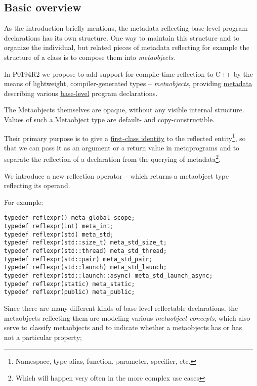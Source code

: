 \subsection{Basic overview}

As the introduction briefly mentions, the metadata reflecting base-level
program declarations has its own structure. One way to maintain this structure
and to organize the individual, but related pieces of metadata reflecting
for example the structure of a class is to compose them into {\em metaobjects}.

In P0194R2 we propose to add support for
compile-time reflection to C++ by the means of lightweight, compiler-generated
types -- {\em metaobjects}, providing \hyperref[term-metadata]{metadata}
describing various \hyperref[term-base-meta-level]{base-level} program declarations.

The Metaobjects themselves are opaque, without any visible internal structure.
Values of such a Metaobject type are default- and copy-constructible.

Their primary purpose is to give a \hyperref[term-first-class]{first-class identity}
to the reflected entity\footnote{Namespace, type alias, function, parameter,
specifier, etc.}, so that we can pass it as an argument or a return value
in metaprograms and to separate the reflection of a declaration from the querying
of metadata\footnote {Which will happen very often in the more complex use cases}.

We introduce a new reflection operator -- \verb@reflexpr@ which returns a
metaobject type reflecting its operand.

For example:

\begin{verbatim}
typedef reflexpr() meta_global_scope;
typedef reflexpr(int) meta_int;
typedef reflexpr(std) meta_std;
typedef reflexpr(std::size_t) meta_std_size_t;
typedef reflexpr(std::thread) meta_std_thread;
typedef reflexpr(std::pair) meta_std_pair;
typedef reflexpr(std::launch) meta_std_launch;
typedef reflexpr(std::launch::async) meta_std_launch_async;
typedef reflexpr(static) meta_static;
typedef reflexpr(public) meta_public;
\end{verbatim}

Since there are many different kinds of
base-level reflectable declarations, the metaobjects reflecting them are
modeling various {\em metaobject concepts}, which also serve to classify
metaobjects and to indicate whether a metaobjects has or has not a particular
property;

